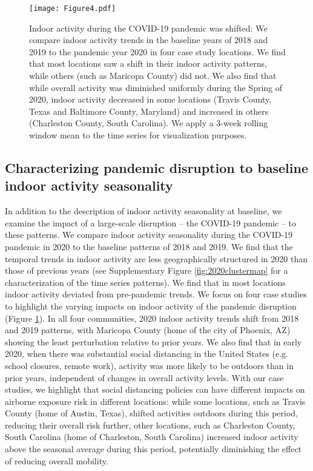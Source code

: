 \documentclass{article}
\begin{document}
\begin{figure}
    \centering
    \texttt{[image: Figure4.pdf]}
    \caption{Indoor activity during the COVID-19 pandemic was shifted: We compare indoor activity trends in the baseline years of 2018 and 2019 to the pandemic year 2020 in four case study locations. We find that most locations saw a shift in their indoor activity patterns, while others (such as Maricopa County) did not. We also find that while overall activity was diminished uniformly during the Spring of 2020, indoor activity decreased in some locations (Travis County, Texas and Baltimore County, Maryland) and increased in others (Charleston County, South Carolina). We apply a 3-week rolling window mean to the time series for visualization purposes.}
    \label{fig:2020indoor}
\end{figure}

\subsection*{Characterizing pandemic disruption to baseline indoor activity seasonality}
In addition to the description of indoor activity seasonality at baseline, we examine the impact of a large-scale disruption -- the COVID-19 pandemic -- to these patterns. We compare indoor activity seasonality during the COVID-19 pandemic in 2020 to the baseline patterns of 2018 and 2019. We find that the temporal trends in indoor activity are less geographically structured in 2020 than those of previous years (see Supplementary Figure \ref{fig:2020clustermap} for a characterization of the time series patterns). We find that in most locations indoor activity deviated from pre-pandemic trends. We focus on four case studies to highlight the varying impacts on indoor activity of the pandemic disruption (Figure \ref{fig:2020indoor}). In all four communities, 2020 indoor activity trends shift from 2018 and 2019 patterns, with Maricopa County (home of the city of Phoenix, AZ) showing the least perturbation relative to prior years. We also find that in early 2020, when there was substantial social distancing in the United States (e.g. school closures, remote work), activity was more likely to be outdoors than in prior years, independent of changes in overall activity levels. With our case studies, we highlight that social distancing policies can have different impacts on airborne exposure risk in different locations: while some locations, such as Travis County (home of Austin, Texas), shifted activities outdoors during this period, reducing their overall risk further, other locations, such as Charleston County, South Carolina (home of Charleston, South Carolina) increased indoor activity above the seasonal average during this period, potentially diminishing the effect of reducing overall mobility.
\end{document}
